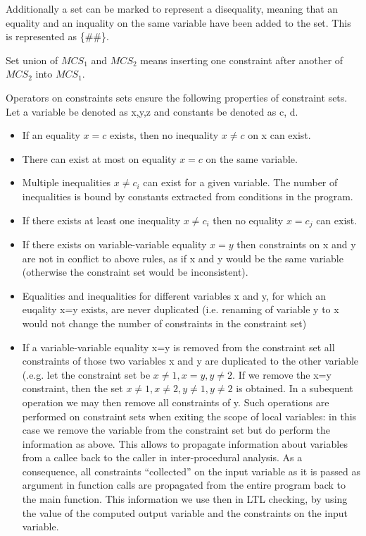 Additionally a set can be marked to represent a disequality, meaning that an equality and an inquality on the same variable have been added to the set. This is represented as \{\#\#\}.

Set union of $MCS_1$ and $MCS_2$ means inserting one constraint after another of $MCS_2$ into $MCS_1$.

Operators on constraints sets ensure the following properties of
constraint sets. Let a variable be denoted as x,y,z and constants be denoted as c, d.

\begin{itemize}
\item If an equality $x=c$ exists, then no inequality $x\neq c$ on x can exist.
\item There can exist at most on equality $x=c$ on the same variable.
\item Multiple inequalities $x \neq c_i$ can exist for a given variable. The number of inequalities is bound by constants extracted from conditions in the program.
\item If there exists at least one inequality $x\neq c_i$ then no equality $x=c_j$ can exist.
\item If there exists on variable-variable equality $x=y$ then constraints on x and y are not in conflict to above rules, as if x and y would be the same variable (otherwise the constraint set would be inconsistent).
\item Equalities and inequalities for different variables x and y, for which an euqality x=y exists, are never duplicated (i.e. renaming of variable y to x would not change the number of constraints in the constraint set)
\item If a variable-variable equality x=y is removed from the
  constraint set all constraints of those two variables x and y are
  duplicated to the other variable (.e.g. let the constraint set be
  ${x\neq 1, x=y, y\neq 2}$. If we remove the x=y constraint, then the
  set ${x\neq 1, x\neq 2, y\neq 1, y \neq 2}$ is obtained. In a
  subequent operation we may then remove all constraints of y. Such
  operations are performed on constraint sets when exiting the scope
  of local variables: in this case we remove the variable from the
  constraint set but do perform the information as above. This allows
  to propagate information about variables from a callee back to the
  caller in inter-procedural analysis. As a consequence, all
  constraints ``collected'' on the input variable as it is passed as
  argument in function calls are propagated from the entire program
  back to the main function. This information we use then in LTL
  checking, by using the value of the computed output variable and the
  constraints on the input variable.
\end{itemize}

